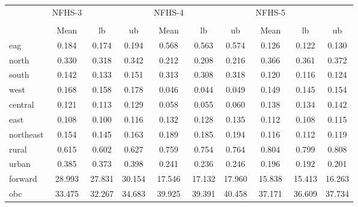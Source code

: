 {
\def\sym#1{\ifmmode^{#1}\else\(^{#1}\)\fi}
\begin{tabular}{l*{3}{ccc}}
\hline\hline
                    &      NFHS-3&            &            &      NFHS-4&            &            &      NFHS-5&            &            \\
                    &\multicolumn{3}{c}{}                  &\multicolumn{3}{c}{}                  &\multicolumn{3}{c}{}                  \\
                    &        Mean&          lb&          ub&        Mean&          lb&          ub&        Mean&          lb&          ub\\
\hline
eag                 &       0.184&       0.174&       0.194&       0.568&       0.563&       0.574&       0.126&       0.122&       0.130\\
north               &       0.330&       0.318&       0.342&       0.212&       0.208&       0.216&       0.366&       0.361&       0.372\\
south               &       0.142&       0.133&       0.151&       0.313&       0.308&       0.318&       0.120&       0.116&       0.124\\
west                &       0.168&       0.158&       0.178&       0.046&       0.044&       0.049&       0.149&       0.145&       0.154\\
central             &       0.121&       0.113&       0.129&       0.058&       0.055&       0.060&       0.138&       0.134&       0.142\\
east                &       0.108&       0.100&       0.116&       0.132&       0.128&       0.135&       0.112&       0.108&       0.115\\
northeast           &       0.154&       0.145&       0.163&       0.189&       0.185&       0.194&       0.116&       0.112&       0.119\\
rural               &       0.615&       0.602&       0.627&       0.759&       0.754&       0.764&       0.804&       0.799&       0.808\\
urban               &       0.385&       0.373&       0.398&       0.241&       0.236&       0.246&       0.196&       0.192&       0.201\\
forward             &      28.993&      27.831&      30.154&      17.546&      17.132&      17.960&      15.838&      15.413&      16.263\\
obc                 &      33.475&      32.267&      34.683&      39.925&      39.391&      40.458&      37.171&      36.609&      37.734\\

\end{tabular}}
